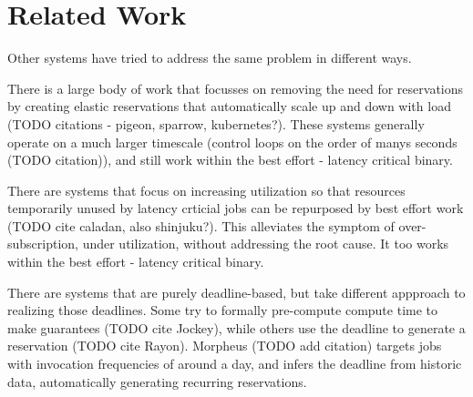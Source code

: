\section{Related Work}

Other systems have tried to address the same problem in different ways. 

There is a large body of work that focusses on removing the need for
reservations by creating elastic reservations that automatically scale up and
down with load (TODO citations - pigeon, sparrow, kubernetes?). These systems
generally operate on a much larger timescale (control loops on the order of
manys seconds (TODO citation)), and still work within the best effort - latency
critical binary. 

There are systems that focus on increasing utilization so that resources
temporarily unused by latency crticial jobs can be repurposed by best effort
work (TODO cite caladan, also shinjuku?). This alleviates the symptom of
over-subscription, under utilization, without addressing the root cause. It too
works within the best effort - latency critical binary. 

There are systems that are purely deadline-based, but take different appproach
to realizing those deadlines. Some try to formally pre-compute compute time to
make guarantees (TODO cite Jockey), while others use the deadline to generate a
reservation (TODO cite Rayon). Morpheus (TODO add citation) targets jobs with
invocation frequencies of around a day, and infers the deadline from historic
data, automatically generating recurring reservations.

